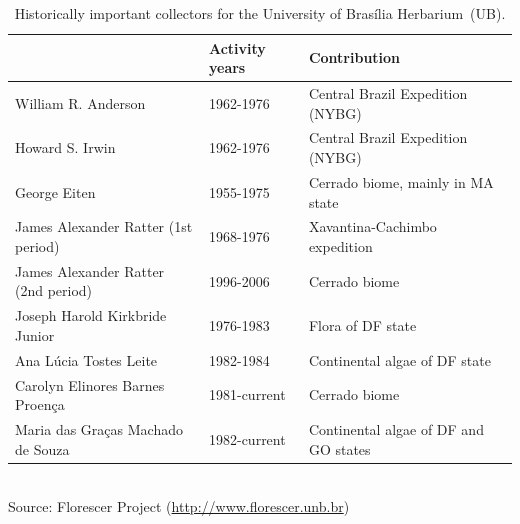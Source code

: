 \begin{table}[H]
  \caption{Historically important collectors for the University of Brasília Herbarium~(UB).}
  \footnotesize
  \begin{center}
  \begin{tabular}{l l l}
      & Activity years & Contribution\\
      \hline
      William R. Anderson & 1962-1976 & Central Brazil Expedition (NYBG)\\
      Howard S. Irwin & 1962-1976 & Central Brazil Expedition (NYBG)\\
      George Eiten & 1955-1975\footnotemark & Cerrado biome, mainly in MA state \\
      James Alexander Ratter (1st period) & 1968-1976 & Xavantina-Cachimbo expedition \\
      James Alexander Ratter (2nd period) & 1996-2006 & Cerrado biome \\
      Joseph Harold Kirkbride Junior & 1976-1983 & Flora of DF state\\
      Ana Lúcia Tostes Leite & 1982-1984 & Continental algae of DF state\\
      Carolyn Elinores Barnes Proença & 1981-current & Cerrado biome \\
      Maria das Graças Machado de Souza & 1982-current & Continental algae of DF and GO states\\
      \hline
  \end{tabular}
  \\[1.5em]
  \hfill Source: Florescer Project (\url{http://www.florescer.unb.br})
  \end{center}
  \label{table:ub_collectors_florescer}
  \normalsize
\end{table}


